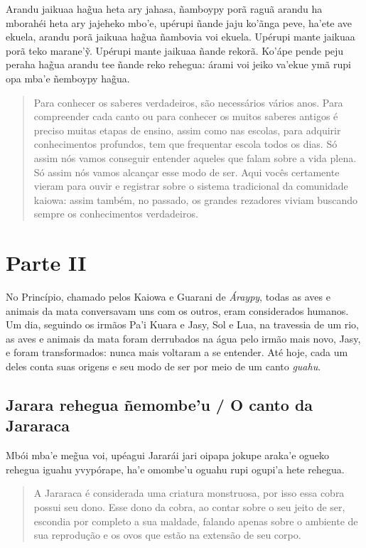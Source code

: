 \begin{itemize}
Arandu jaikuaa hag̃ua heta ary jahasa, ñamboypy porã raguã arandu ha
mborahéi heta ary jajeheko mbo'e, upérupi ñande jaju ko'ãnga peve,
ha'ete ave ekuela, arandu porã jaikuaa hag̃ua ñambovia voi ekuela.
Upérupi mante jaikuaa porã teko marane'ỹ. Upérupi mante jaikuaa ñande
rekorã. Ko'ápe pende peju peraha hag̃ua arandu tee ñande reko rehegua:
árami voi jeiko va'ekue ymã rupi opa mba'e ñemboypy hag̃ua.

\begin{quote}
Para conhecer os saberes verdadeiros, são necessários vários anos. Para
compreender cada canto ou para conhecer os muitos saberes antigos é
preciso muitas etapas de ensino, assim como nas escolas, para adquirir
conhecimentos profundos, tem que frequentar escola todos os dias. Só
assim nós vamos conseguir entender aqueles que falam sobre a vida plena.
Só assim nós vamos alcançar esse modo de ser. Aqui vocês certamente
vieram para ouvir e registrar sobre o sistema tradicional da comunidade
kaiowa: assim também, no passado, os grandes rezadores viviam buscando
sempre os conhecimentos verdadeiros.
\end{quote}

\part{Parte II}


No Princípio, chamado pelos Kaiowa e Guarani de \emph{Áraypy}, todas as
aves e animais da mata conversavam uns com os outros, eram considerados
humanos. Um dia, seguindo os irmãos Pa'i Kuara e Jasy, Sol e Lua, na
travessia de um rio, as aves e animais da mata foram derrubados na água
pelo irmão mais novo, Jasy, e foram transformados: nunca mais voltaram a
se entender. Até hoje, cada um deles conta suas origens e seu modo de
ser por meio de um canto \emph{guahu}.

\chapter{Jarara rehegua ñemombe'u / O canto da Jararaca}

Mbói mba'e meg̃ua voi, upéagui Jararái jari oipapa jokupe araka'e ogueko
rehegua iguahu yvypórape, ha'e omombe'u oguahu rupi ogupi'a hete
rehegua.

\begin{quote}
A Jararaca é considerada uma criatura monstruosa, por isso essa cobra
possui seu dono. Esse dono da cobra, ao contar sobre o seu jeito de ser,
escondia por completo a sua maldade, falando apenas sobre o ambiente de
sua reprodução e os ovos que estão na extensão de seu corpo.
\end{quote}


\end{itemize}
